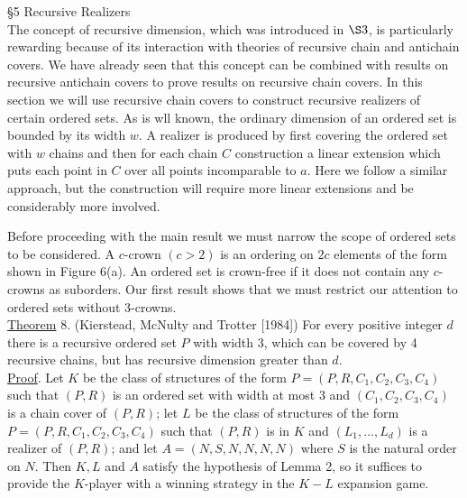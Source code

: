 \documentclass[twoside]{article}
\begin{document}
\noindent\S 5 Recursive Realizers\\


The concept of recursive dimension, which was introduced in $\S 3$, is particularly
rewarding because of its interaction with theories of recursive chain and antichain covers.
We have already seen that this concept can be combined with results on recursive antichain covers to prove results
on recursive chain covers. In this section we will use recursive chain covers to construct
recursive realizers of certain ordered sets. As is wll known, the ordinary dimension
of an ordered set is bounded by its width $w$. A realizer is produced by first covering the ordered set with 
$w$ chains and then for each chain $C$ construction a linear extension which puts each point in 
$C$ over all points incomparable to $a$. Here we follow a similar approach, but the construction
will require more linear extensions and be considerably more involved.

%
%
Before proceeding with the main result we must narrow the scope of ordered
sets to be considered. A $c$-crown $(c>2)$ is an ordering on $2c$ elements
of the form shown in Figure 6(a). An ordered set is crown-free
if it does not contain any $c$-crowns as suborders. Our first result shows that we must restrict our
attention to ordered sets without 3-crowns.\\
\newline
\underline{Theorem} 8. (Kierstead, McNulty and Trotter [1984]) For every positive integer $d$ there is a 
recursive ordered set $P$ with width 3, which can be covered by 4 recursive chains,
but has recursive dimension greater than $d$.\\
\newline
\underline{Proof}. Let $K$ be the class of structures of the form
$P=(P,R,C_1,C_2,C_3,C_4)$ such that $(P,R)$ is an ordered set with width at most 3 and 
$(C_1,C_2,C_3,C_4)$ is a chain cover of $(P,R)$; let $L$ be the class of structures
of the form $P=(P,R,C_1,C_2,C_3,C_4)$ such that $(P,R)$ is in $K$ and
$(L_1,...,L_d)$ is a realizer of $(P,R)$; and let $A=(N,S,N,N,N,N)$ where
$S$ is the natural order on $N$. Then $K,L$ and $A$ satisfy the hypothesis 
of Lemma 2, so it suffices to provide the $K$-player with a winning strategy
in the $K-L$ expansion game.
\end{document}
